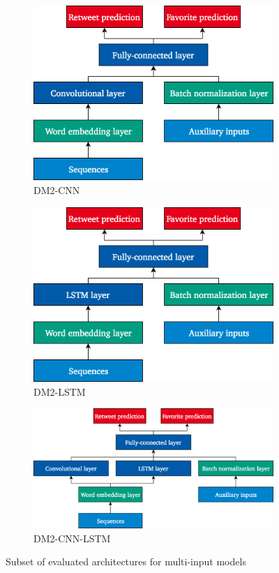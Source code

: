 \begin{figure}[h]
\begin{subfigure}{.5\textwidth}
  \includegraphics[width=.95\linewidth]{img/dm2_cnn}
  \caption{DM2-CNN}
  \label{fig:dm2_cnn}
\end{subfigure}%
\begin{subfigure}{.5\textwidth}
  \includegraphics[width=.95\linewidth]{img/dm2_lstm}
  \caption{DM2-LSTM}
  \label{fig:dm2_lstm}
\end{subfigure}
\begin{subfigure}{.7\textwidth}
  \includegraphics[width=.95\linewidth]{img/dm2_cnn_lstm}
  \caption{DM2-CNN-LSTM}
  \label{fig:dm2_cnn_lstm}
\end{subfigure}
\caption{Subset of evaluated architectures for multi-input models}
\label{fig:dm2_architectures}
\end{figure}

